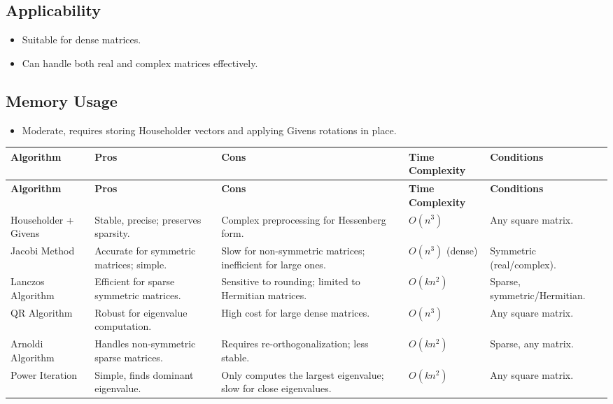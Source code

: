 \documentclass[12pt]{article}
\numberwithin{equation}{section}
\begin{document}
\subsection{Applicability}
\begin{itemize}
    \item Suitable for dense matrices.
    \item Can handle both real and complex matrices effectively.
\end{itemize}


\subsection{Memory Usage}
\begin{itemize}
    \item Moderate, requires storing Householder vectors and applying Givens rotations in place.
\end{itemize}

\begin{longtable}{|p{2.5cm}|p{3.5cm}|p{3.5cm}|p{2.5cm}|p{2.5cm}|}
\hline
\textbf{Algorithm} & \textbf{Pros} & \textbf{Cons} & \textbf{Time Complexity} & \textbf{Conditions} \\ \hline
\endfirsthead
\hline
\textbf{Algorithm} & \textbf{Pros} & \textbf{Cons} & \textbf{Time Complexity} & \textbf{Conditions} \\ \hline
\endhead
Householder + Givens & Stable, precise; preserves sparsity. & Complex preprocessing for Hessenberg form. & \( O(n^3) \) & Any square matrix. \\ \hline
Jacobi Method & Accurate for symmetric matrices; simple. & Slow for non-symmetric matrices; inefficient for large ones. & \( O(n^3) \) (dense) & Symmetric (real/complex). \\ \hline
Lanczos Algorithm & Efficient for sparse symmetric matrices. & Sensitive to rounding; limited to Hermitian matrices. & \( O(kn^2) \) & Sparse, symmetric/Hermitian. \\ \hline
QR Algorithm & Robust for eigenvalue computation. & High cost for large dense matrices. & \( O(n^3) \) & Any square matrix. \\ \hline
Arnoldi Algorithm & Handles non-symmetric sparse matrices. & Requires re-orthogonalization; less stable. & \( O(kn^2) \) & Sparse, any matrix. \\ \hline
Power Iteration & Simple, finds dominant eigenvalue. & Only computes the largest eigenvalue; slow for close eigenvalues. & \( O(kn^2) \) & Any square matrix. \\ \hline
\end{longtable}
\end{document}
